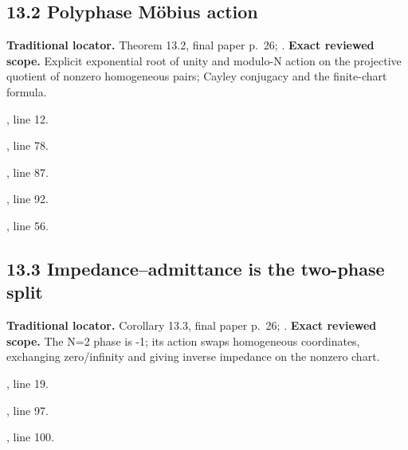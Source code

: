 \subsection{13.2 Polyphase Möbius action}
\label{result:13.2}
\textbf{Traditional locator.} Theorem 13.2, final paper p.~26; .
\textbf{Exact reviewed scope.} Explicit exponential root of unity and modulo-N action on the projective quotient of nonzero homogeneous pairs; Cayley conjugacy and the finite-chart formula.
{\small{}\par}
{\footnotesize\color{muted}, line 12.\par}\smallskip
{\small{}\par}
{\footnotesize\color{muted}, line 78.\par}\smallskip
{\small{}\par}
{\footnotesize\color{muted}, line 87.\par}\smallskip
{\small{}\par}
{\footnotesize\color{muted}, line 92.\par}\smallskip
{\small{}\par}
{\footnotesize\color{muted}, line 56.\par}\smallskip
{}
\subsection{13.3 Impedance–admittance is the two-phase split}
\label{result:13.3}
\textbf{Traditional locator.} Corollary 13.3, final paper p.~26; .
\textbf{Exact reviewed scope.} The N=2 phase is -1; its action swaps homogeneous coordinates, exchanging zero/infinity and giving inverse impedance on the nonzero chart.
{\small{}\par}
{\footnotesize\color{muted}, line 19.\par}\smallskip
{\small{}\par}
{\footnotesize\color{muted}, line 97.\par}\smallskip
{\small{}\par}
{\footnotesize\color{muted}, line 100.\par}\smallskip
{}

